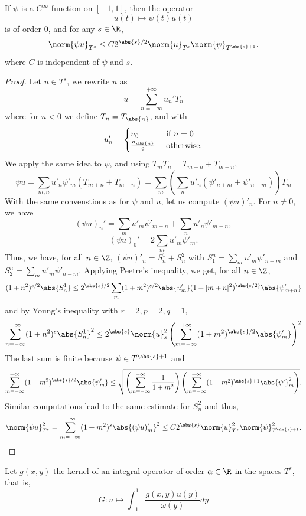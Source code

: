 \documentclass[a4paper]{article}
\begin{document}
	\begin{Prop}
		If $\psi$ is a $C^{\infty}$ function on $[-1,1]$, then the operator
		\[ u(t) \mapsto \psi(t) u(t)\]
		is of order $0$, and for any $s \in \R$, 
		\[ \norm{\psi u}_{T^s} \leq C2^{\abs{s}/2}\norm{u}_{T^s} \norm{\psi}_{T^{\abs{s}+1}}.\]
		where $C$ is independent of $\psi$ and $s$. 
		\begin{proof}
			Let $u \in T^s$, we rewrite $u$ as 
			\[ u = \sum_{n = -\infty}^{+ \infty}u_n'T_n\]
			where for $n< 0$ we define $T_{n} = T_{\abs{n}}$, and with 
			\[u_n' = \begin{cases}
			u_0 & \text{ if } n = 0\\
			\frac{u_{\abs{n}}}{2} & \text{ otherwise.}
			\end{cases}\]
			We apply the same idea to $\psi$, and using $T_m T_n = T_{m+n} + T_{m-n}$, 
			\[\psi u = \sum_{m,n} u'_n \psi'_m (T_{m+n} + T_{m-n}) = \sum_{m} \left(\sum_{n}u'_n(\psi'_{n + m} + \psi'_{n - m})\right) T_m\]
			With the same convenstions as for $\psi$ and $u$, let us compute $(\psi u)'_n$. For $ n \neq 0$, we have
			\[(\psi u)_n' = \sum_{m} u'_m \psi'_{m+n}+\sum_n u'_n \psi'_{m-n},\]
			\[(\psi u)_0' = 2\sum_{m} u'_m \psi'_m.\]
			Thus, we have, for all $n \in \Z$, $(\psi u)'_n = S^1_n + S^2_n$ with $S_1^n = \sum_{m} u'_m \psi'_{n+m}$ and $S_2^n = \sum_m u'_m \psi'_{n - m}$. Applying Peetre's inequality, we get, for all $n \in \Z$, 
			\[(1 + n^2)^{s/2}\abs{S^1_n} \leq 2^{\abs{s}/2}\sum_{m}(1 + m^2)^{s/2} \abs{u'_m}  (1 + |m+n|^2)^{\abs{s/2}} \abs{\psi'_{m+n}} \]
			and by Young's inequality with $r = 2, p = 2, q = 1$, 
			\[\sum_{n = - \infty}^{+ \infty} (1+ n^2)^s \abs{S^1_n}^2 \leq 2^{\abs{s}}\norm{u}_s^2 \left(\sum_{m=-\infty}^{+\infty} (1 + m^2)^{\abs{s}/2}\abs{\psi'_m}\right)^2 \]		
			The last sum is finite because $\psi \in T^{\abs{s}+1}$ and
			\[\sum_{m=-\infty}^{+\infty}(1 + m^2)^{\abs{s}/2} \abs{\psi'_m} \leq \sqrt{\left(\sum_{m = -\infty}^{+ \infty} \frac{1}{1 + m^2} \right)\left(\sum_{m=-\infty}^{+\infty} (1 + m^2)^{\abs{s}+1}\abs{\psi'}_m^2\right)}.\]
			Similar computations lead to the same estimate for $S^2_n$ and thus, 
			\[\norm{\psi u}_{T^s}^2 = \sum_{m = - \infty}^{+ \infty} (1 + m^2)^s \abs{(\psi u)'_m}^2 \leq C 2^{\abs{s}} \norm{u}_{T^s}^2 \norm{\psi}_{T^{\abs{s} + 1}}^2. \]
		\end{proof}
		\begin{Lem}
			\label{ordreNoyauxMultipl}
			Let $g(x,y)$ the kernel of an integral operator of order $\alpha \in \R$ in the spaces $T^s$, that is,
			\[G : u \mapsto \int_{-1}^{1} \frac{g(x,y) u(y)}{\omega(y)}dy\]

\end{Lem}
\end{Prop}
\end{document}
